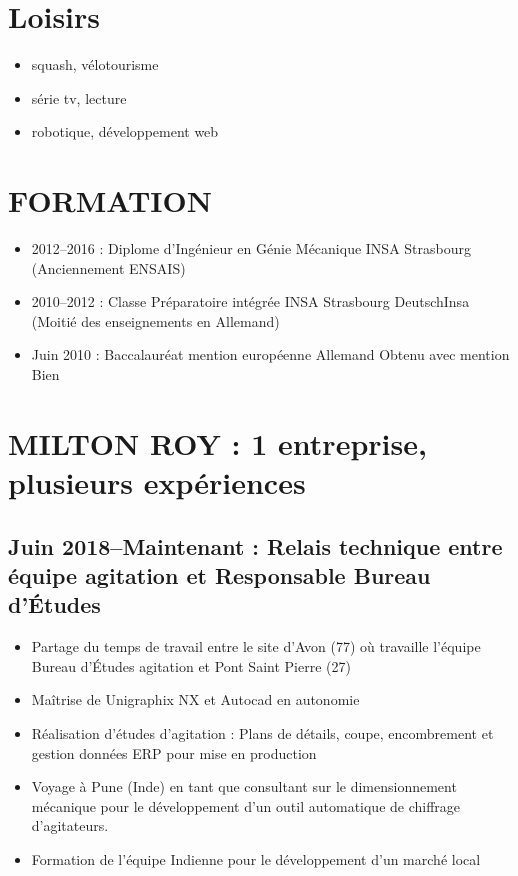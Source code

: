 \documentclass[10pt,a4paper,sans]{article}
\begin{document}
\begin{minipage}[t]{0.23\textwidth}
    \section{Loisirs}
        \begin{itemize}
            \item{squash, vélotourisme}
            \item{série tv, lecture}
            \item{robotique, développement web}
        \end{itemize}
\end{minipage}
\hfill
\begin{minipage}[t]{0.72\textwidth}
    \section{FORMATION}
        \begin{itemize}
            \item{2012--2016 : Diplome d'Ingénieur en Génie Mécanique INSA Strasbourg (Anciennement ENSAIS)}
            \item{2010--2012 : Classe Préparatoire intégrée INSA Strasbourg DeutschInsa (Moitié des enseignements en Allemand)}
            \item{Juin 2010 : Baccalauréat mention européenne Allemand Obtenu avec mention Bien}
        \end{itemize}

    \section{MILTON ROY : 1 entreprise, plusieurs expériences}
    \subsection{Juin 2018--Maintenant : Relais technique entre équipe agitation et Responsable Bureau d'Études}
    \begin{itemize}%
        \item Partage du temps de travail entre le site d’Avon (77) où travaille l’équipe Bureau d’Études agitation et Pont Saint Pierre (27)
        \item Maîtrise de Unigraphix NX et Autocad en autonomie
        \item Réalisation d’études d’agitation : Plans de détails, coupe, encombrement et gestion données ERP pour mise en production
        \item Voyage à Pune (Inde) en tant que consultant sur le dimensionnement mécanique pour le développement d’un outil automatique de chiffrage d’agitateurs.
        \item Formation de l’équipe Indienne pour le développement d’un marché local
    \end{itemize}


\end{minipage}
\end{document}
